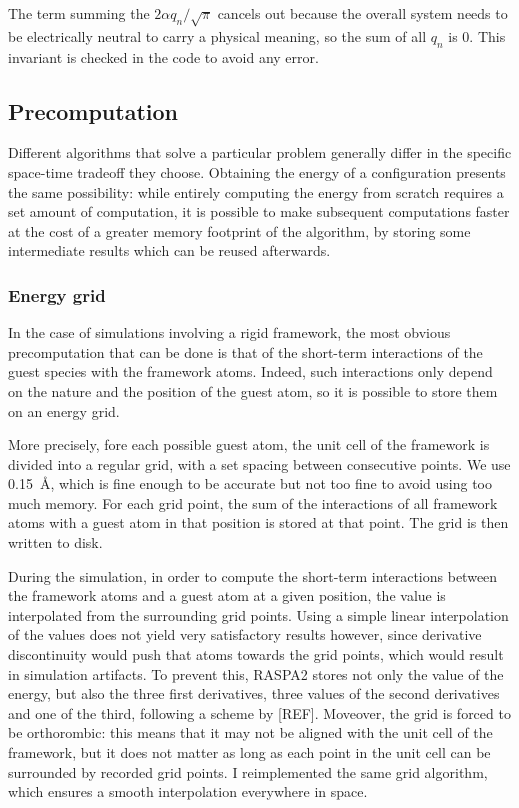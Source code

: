 \documentclass[main.tex]{subfiles}
\begin{document}
The term summing the $2\alpha q_n/\sqrt\pi$ cancels out because the overall system needs to be electrically neutral to carry a physical meaning, so the sum of all $q_n$ is 0. This invariant is checked in the code to avoid any error.

\subsection{Precomputation}

\label{precomputations}

Different algorithms that solve a particular problem generally differ in the specific space-time tradeoff they choose. Obtaining the energy of a configuration presents the same possibility: while entirely computing the energy from scratch requires a set amount of computation, it is possible to make subsequent computations faster at the cost of a greater memory footprint of the algorithm, by storing some intermediate results which can be reused afterwards.

\subsubsection{Energy grid}

\label{energygrid}

In the case of simulations involving a rigid framework, the most obvious precomputation that can be done is that of the short-term interactions of the guest species with the framework atoms. Indeed, such interactions only depend on the nature and the position of the guest atom, so it is possible to store them on an energy grid.

More precisely, fore each possible guest atom, the unit cell of the framework is divided into a regular grid, with a set spacing between consecutive points. We use \qty{0.15}{\angstrom}, which is fine enough to be accurate but not too fine to avoid using too much memory. For each grid point, the sum of the interactions of all framework atoms with a guest atom in that position is stored at that point. The grid is then written to disk.

During the simulation, in order to compute the short-term interactions between the framework atoms and a guest atom at a given position, the value is interpolated from the surrounding grid points. Using a simple linear interpolation of the values does not yield very satisfactory results however, since derivative discontinuity would push that atoms towards the grid points, which would result in simulation artifacts. To prevent this, RASPA2 stores not only the value of the energy, but also the three first derivatives, three values of the second derivatives and one of the third, following a scheme by [REF]. Moveover, the grid is forced to be orthorombic: this means that it may not be aligned with the unit cell of the framework, but it does not matter as long as each point in the unit cell can be surrounded by recorded grid points. I reimplemented the same grid algorithm, which ensures a smooth interpolation everywhere in space.
\end{document}

